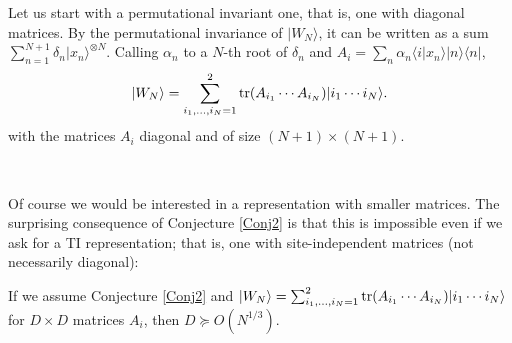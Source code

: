 \documentclass[aps,prl,epsfig,graphics,floatfix,mathbbm,a4paper]{article}
\newcommand{\1}{\mathbbm{1}}
\renewcommand{\>}{\rangle}
\newcommand{\<}{\langle}
\begin{document}
Let us start with a permutational invariant one, that is, one with
diagonal matrices. By the permutational invariance of $|W_N\>$, it
can be written as a sum $\sum_{n=1}^{N+1} \delta_n |x_n\>^{\otimes
            N}$. Calling $\alpha_n$ to a $N$-th root of $\delta_n$ and
$A_i=\sum_n \alpha_n \<i|x_n\> |n\>\<n|$,
$$|W_N\>=\sum_{i_1,\ldots, i_N=1}^2 \trace(A_{i_1}\cdots A_{i_N})|i_1\cdots i_N\>.$$
with the matrices $A_i$ diagonal and of size $(N+1)\times (N+1)$.

\

Of course we would be interested in a representation with smaller
matrices. The surprising consequence of Conjecture \ref{Conj2} is
that this is impossible even if we ask for a TI representation;
that is, one with site-independent matrices (not necessarily
diagonal):

\begin{corollary}
    If we assume Conjecture \ref{Conj2} and $|W_N\>=\sum_{i_1,\ldots,
            i_N=1}^2 \trace(A_{i_1}\cdots A_{i_N})|i_1\cdots i_N\>$ for
    $D\times D$ matrices $A_i$, then $D\succeq O\left(N^{1/3}\right)$.
\end{corollary}
\end{document}
